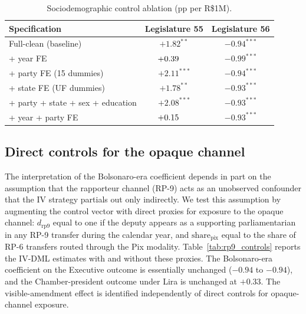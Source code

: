 \documentclass[preprint,12pt,authoryear]{elsarticle}
\begin{document}
\begin{table}[htbp]
\centering
\caption{Sociodemographic control ablation (pp per R\$1M).}
\label{tab:ablation}
\begin{threeparttable}
\small
\begin{tabular}{lcc}
\toprule
Specification & Legislature 55 & Legislature 56 \\
\midrule
Full-clean (baseline)                       & $+1.82^{**}$  & $-0.94^{***}$ \\
\quad + year FE                             & $+0.39\hspace{1.4em}$ & $-0.99^{***}$ \\
\quad + party FE (15 dummies)               & $+2.11^{***}$ & $-0.94^{***}$ \\
\quad + state FE (UF dummies)               & $+1.78^{**}$  & $-0.93^{***}$ \\
\quad + party + state + sex + education     & $+2.08^{***}$ & $-0.93^{***}$ \\
\quad + year + party FE                     & $+0.15\hspace{1.4em}$ & $-0.93^{***}$ \\
\bottomrule
\end{tabular}
\end{threeparttable}
\end{table}

\subsection{Direct controls for the opaque channel}
\label{app:rp9_controls}

The interpretation of the Bolsonaro-era coefficient depends in part on the assumption that the rapporteur channel (RP-9) acts as an unobserved confounder that the IV strategy partials out only indirectly. We test this assumption by augmenting the control vector with direct proxies for exposure to the opaque channel: $d_{\mathrm{rp9}}$ equal to one if the deputy appears as a supporting parliamentarian in any RP-9 transfer during the calendar year, and $\mathrm{share}_{\mathrm{pix}}$ equal to the share of RP-6 transfers routed through the Pix modality. Table~\ref{tab:rp9_controls} reports the IV-DML estimates with and without these proxies. The Bolsonaro-era coefficient on the Executive outcome is essentially unchanged ($-0.94$ to $-0.94$), and the Chamber-president outcome under Lira is unchanged at $+0.33$. The visible-amendment effect is identified independently of direct controls for opaque-channel exposure.
\end{document}
